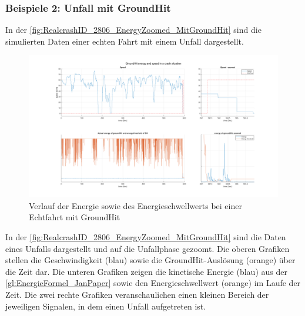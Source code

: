 \subsubsection{Beispiele 2: Unfall mit GroundHit}
In der \autoref{fig:RealcrashID_2806_EnergyZoomed_MitGroundHit} sind die simulierten Daten einer echten Fahrt mit einem Unfall dargestellt. 

\begin{figure}[H]
	\centering
	\includegraphics[width=\linewidth]{Bilder/GH1_speed_GHEnergy.png}
	\caption{Verlauf der Energie sowie des Energieschwellwerts bei einer Echtfahrt mit GroundHit} %
	\label{fig:RealcrashID_2806_EnergyZoomed_MitGroundHit}
\end{figure}
In der \autoref{fig:RealcrashID_2806_EnergyZoomed_MitGroundHit} sind die Daten eines Unfalls dargestellt und auf die Unfallphase gezoomt. 
Die oberen Grafiken stellen die Geschwindigkeit (blau) sowie die GroundHit-Auslösung (orange) über die Zeit dar.
Die unteren Grafiken zeigen die kinetische Energie (blau) aus der \autoref{gl:EnergieFormel_JanPaper} sowie den Energieschwellwert (orange) im Laufe der Zeit.
Die zwei rechte Grafiken veranschaulichen einen kleinen Bereich der jeweiligen Signalen, in dem einen Unfall aufgetreten ist.

